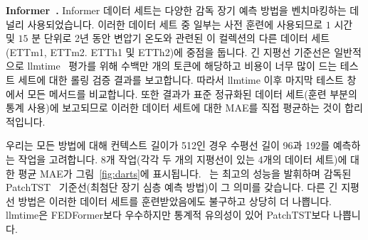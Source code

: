 \documentclass{article}
\begin{document}
{\bf Informer~\citep{zhou2021informer}.} Informer 데이터 세트는 다양한 감독 장기 예측 방법을 벤치마킹하는 데 널리 사용되었습니다. 이러한 데이터 세트 중 일부는 사전 훈련에 사용되므로 $1$ 시간 및 $15$ 분 단위로 2년 동안 변압기 온도와 관련된 이 컬렉션의 다른 데이터 세트(ETTm1, ETTm2. ETTh1 및 ETTh2)에 중점을 둡니다. 긴 지평선 기준선은 일반적으로 llmtime~\citep{gruver2023large} 평가를 위해 수백만 개의 토큰에 해당하고 비용이 너무 많이 드는 테스트 세트에 대한 롤링 검증 결과를 보고합니다. 따라서 llmtime 이후 마지막 테스트 창에서 모든 메서드를 비교합니다. 또한 결과가 표준 정규화된 데이터 세트(훈련 부분의 통계 사용)에 보고되므로 이러한 데이터 세트에 대한 MAE를 직접 평균하는 것이 합리적입니다.

우리는 모든 방법에 대해 컨텍스트 길이가 512인 경우 수평선 길이 96과 192를 예측하는 작업을 고려합니다. 8개 작업(각각 두 개의 지평선이 있는 4개의 데이터 세트)에 대한 평균 MAE가 그림~\ref{fig:darts}에 표시됩니다. \ours~는 최고의 성능을 발휘하며 감독된 PatchTST~\citep{nie2022time} 기준선(최첨단 장기 심층 예측 방법)이 그 의미를 갖습니다. 다른 긴 지평선 방법은 이러한 데이터 세트를 훈련받았음에도 불구하고 상당히 더 나쁩니다. llmtime은 FEDFormer보다 우수하지만 통계적 유의성이 있어 PatchTST보다 나쁩니다.





\end{document}
